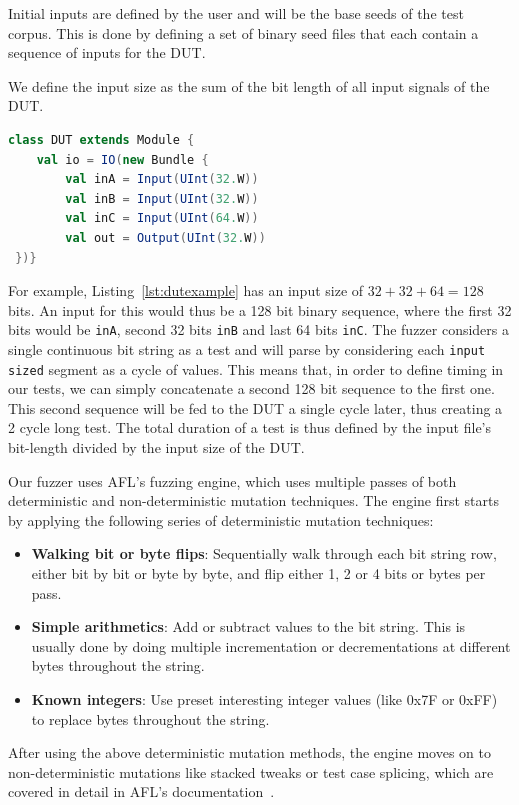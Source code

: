 \documentclass[conference]{IEEEtran}
\begin{document}
Initial inputs are defined by the user and will be the base seeds of the test corpus.
This is done by defining a set of binary seed files that each contain a sequence of inputs for the DUT.

We define the input size as the sum of the bit length of all input signals of the DUT.
\begin{lstlisting}[captionpos=b,caption={Basic DUT with two 32 bit inputs, one 64 input, as well as a 32 bit output.},label={lst:dutexample},language=scala]
class DUT extends Module {
    val io = IO(new Bundle {
        val inA = Input(UInt(32.W))
        val inB = Input(UInt(32.W))
        val inC = Input(UInt(64.W))
        val out = Output(UInt(32.W))
 })}
\end{lstlisting}
For example, Listing~\ref{lst:dutexample} has an input size of $32 + 32 + 64 = 128$ bits.
An input for this would thus be a 128 bit binary sequence, where the first 32 bits would be \texttt{inA}, second 32 bits \texttt{inB} and last 64 bits \texttt{inC}.
The fuzzer considers a single continuous bit string as a test and will parse by considering each \texttt{input sized} segment as a cycle of values.
This means that, in order to define timing in our tests, we can simply concatenate a second 128 bit sequence to the first one.
This second sequence will be fed to the DUT a single cycle later, thus creating a 2 cycle long test.
The total duration of a test is thus defined by the input file's bit-length divided by the input size of the DUT.

Our fuzzer uses AFL's fuzzing engine, which uses multiple passes of both deterministic and non-deterministic mutation techniques.
The engine first starts by applying  the following series of deterministic mutation techniques:
\begin{itemize}
\item \textbf{Walking bit or byte flips}: Sequentially walk through each bit string row, either bit by bit or byte by byte, and flip either 1, 2 or 4 bits or bytes per pass.
\item \textbf{Simple arithmetics}: Add or subtract values to the bit string. This is usually done by doing multiple incrementation or decrementations at different bytes throughout the string.
\item \textbf{Known integers}: Use preset interesting integer values (like 0x7F or 0xFF) to replace bytes throughout the string.
\end{itemize}
After using the above deterministic mutation methods, the engine moves on to non-deterministic mutations like stacked tweaks or test case splicing, which are covered in detail in AFL's documentation~\cite{afl:fuzzingtechniques}.
\end{document}
